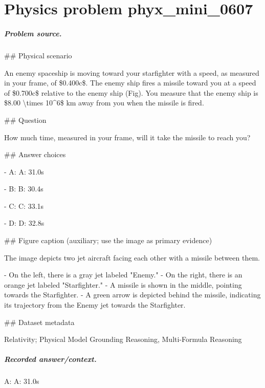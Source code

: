 
\chapter{Physics problem phyx\_mini\_0607}
\label{ch:PhyXMiniProblems_problem_phyx_mini_0607}

\paragraph{Problem source.}
\#\# Physical scenario

An enemy spaceship is moving toward your starfighter with a speed, as measured in your frame, of \$0.400c\$. The enemy ship fires a missile toward you at a speed of \$0.700c\$ relative to the enemy ship (Fig). You measure that the enemy ship is \$8.00 \textbackslash{}times 10\textasciicircum{}6\$ km away from you when the missile is fired.

\#\# Question

How much time, measured in your frame, will it take the missile to reach you?

\#\# Answer choices

- A: A: 31.0s

- B: B: 30.4s

- C: C: 33.1s

- D: D: 32.8s

\#\# Figure caption (auxiliary; use the image as primary evidence)

The image depicts two jet aircraft facing each other with a missile between them. 

- On the left, there is a gray jet labeled "Enemy."
- On the right, there is an orange jet labeled "Starfighter."
- A missile is shown in the middle, pointing towards the Starfighter. 
- A green arrow is depicted behind the missile, indicating its trajectory from the Enemy jet towards the Starfighter.

\#\# Dataset metadata

Relativity; Physical Model Grounding Reasoning, Multi-Formula Reasoning

\paragraph{Recorded answer/context.}
A: A: 31.0s

